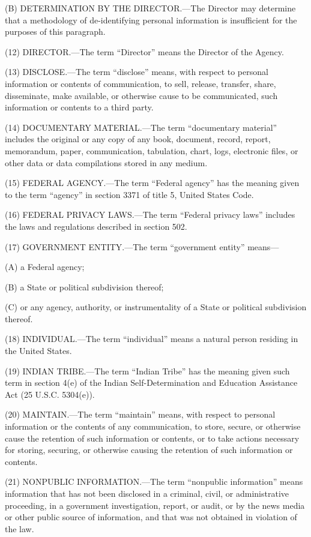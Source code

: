 (B) DETERMINATION BY THE DIRECTOR.—The Director may determine that a methodology of de-identifying personal information is insufficient for the purposes of this paragraph.

(12) DIRECTOR.—The term “Director” means the Director of the Agency.

(13) DISCLOSE.—The term “disclose” means, with respect to personal information or contents of communication, to sell, release, transfer, share, disseminate, make available, or otherwise cause to be communicated, such information or contents to a third party.

(14) DOCUMENTARY MATERIAL.—The term “documentary material” includes the original or any copy of any book, document, record, report, memorandum, paper, communication, tabulation, chart, logs, electronic files, or other data or data compilations stored in any medium.

(15) FEDERAL AGENCY.—The term “Federal agency” has the meaning given to the term “agency” in section 3371 of title 5, United States Code.

(16) FEDERAL PRIVACY LAWS.—The term “Federal privacy laws” includes the laws and regulations described in section 502.

(17) GOVERNMENT ENTITY.—The term “government entity” means—

(A) a Federal agency;

(B) a State or political subdivision thereof;

(C) or any agency, authority, or instrumentality of a State or political subdivision thereof.

(18) INDIVIDUAL.—The term “individual” means a natural person residing in the United States.

(19) INDIAN TRIBE.—The term “Indian Tribe” has the meaning given such term in section 4(e) of the Indian Self-Determination and Education Assistance Act (25 U.S.C. 5304(e)).

(20) MAINTAIN.—The term “maintain” means, with respect to personal information or the contents of any communication, to store, secure, or otherwise cause the retention of such information or contents, or to take actions necessary for storing, securing, or otherwise causing the retention of such information or contents.

(21) NONPUBLIC INFORMATION.—The term “nonpublic information” means information that has not been disclosed in a criminal, civil, or administrative proceeding, in a government investigation, report, or audit, or by the news media or other public source of information, and that was not obtained in violation of the law.

